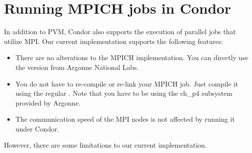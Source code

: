\section{\label{sec:MPI}Running MPICH jobs in Condor}
In addition to PVM, Condor also supports the execution of parallel jobs
that utilize MPI.
Our current implementation supports the following features:
\begin{itemize}
\item There are no alterations to the MPICH implementation.  You can directly
use the version from Argonne National Labs.

\item You do not have to re-compile or re-link your MPICH job.  Just
compile it using the regular .  Note that you have to be using
the ch\_p4 subsystem provided by Argonne.

\item The communication speed of the MPI nodes is not affected by 
running it under Condor.
\end{itemize}
However, there are some limitations to our current implementation.

